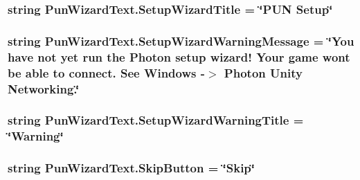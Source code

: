 \subsubsection[{\texorpdfstring{Setup\+Wizard\+Title}{SetupWizardTitle}}]{\setlength{\rightskip}{0pt plus 5cm}string Pun\+Wizard\+Text.\+Setup\+Wizard\+Title = \char`\"{}P\+UN Setup\char`\"{}}\hypertarget{class_pun_wizard_text_a22ff0b63d4b3aa7c5502863e6ad2e675}{}\label{class_pun_wizard_text_a22ff0b63d4b3aa7c5502863e6ad2e675}
\subsubsection[{\texorpdfstring{Setup\+Wizard\+Warning\+Message}{SetupWizardWarningMessage}}]{\setlength{\rightskip}{0pt plus 5cm}string Pun\+Wizard\+Text.\+Setup\+Wizard\+Warning\+Message = \char`\"{}You have not yet run the Photon setup wizard! Your game won\textquotesingle{}t be able to connect. See Windows -\/$>$ Photon Unity Networking.\char`\"{}}\hypertarget{class_pun_wizard_text_a35b799fca80324591711e773435a1837}{}\label{class_pun_wizard_text_a35b799fca80324591711e773435a1837}
\subsubsection[{\texorpdfstring{Setup\+Wizard\+Warning\+Title}{SetupWizardWarningTitle}}]{\setlength{\rightskip}{0pt plus 5cm}string Pun\+Wizard\+Text.\+Setup\+Wizard\+Warning\+Title = \char`\"{}Warning\char`\"{}}\hypertarget{class_pun_wizard_text_ab212b87edb1bf02b98e1ad7e5331b2a4}{}\label{class_pun_wizard_text_ab212b87edb1bf02b98e1ad7e5331b2a4}
\subsubsection[{\texorpdfstring{Skip\+Button}{SkipButton}}]{\setlength{\rightskip}{0pt plus 5cm}string Pun\+Wizard\+Text.\+Skip\+Button = \char`\"{}Skip\char`\"{}}\hypertarget{class_pun_wizard_text_a503099b34e7df57344d72ab814de5931}{}\label{class_pun_wizard_text_a503099b34e7df57344d72ab814de5931}
